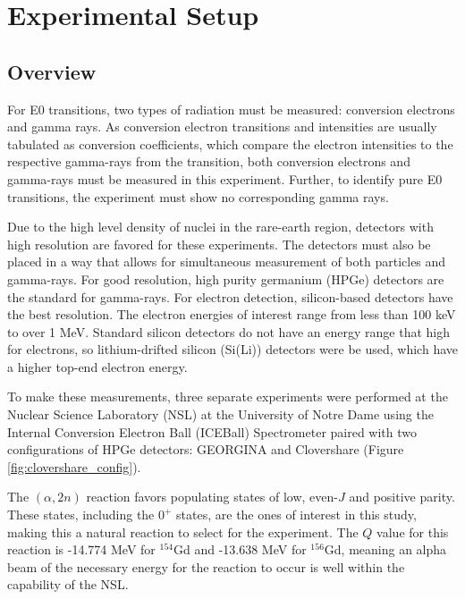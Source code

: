 %
%

\chapter{Experimental Setup}
\label{chap:setup}

\section{Overview}

For E0 transitions, two types of radiation must be measured: conversion electrons and gamma rays. As conversion electron transitions and intensities are usually tabulated as conversion coefficients, which compare the electron intensities to the respective gamma-rays from the transition, both conversion electrons and gamma-rays must be measured in this experiment. Further, to identify pure E0 transitions, the experiment must show no corresponding gamma rays.

Due to the high level density of nuclei in the rare-earth region, detectors with high resolution are favored for these experiments. The detectors must also be placed in a way that allows for simultaneous measurement of both particles and gamma-rays. For good resolution, high purity germanium (HPGe) detectors are the standard for gamma-rays. For electron detection, silicon-based detectors have the best resolution. The electron energies of interest range from less than 100 keV to over 1 MeV. Standard silicon detectors do not have an energy range that high for electrons, so lithium-drifted silicon (Si(Li)) detectors were be used, which have a higher top-end electron energy.

To make these measurements, three separate experiments were performed at the Nuclear Science Laboratory (NSL) at the University of Notre Dame using the Internal Conversion Electron Ball (ICEBall) Spectrometer paired with two configurations of HPGe detectors: GEORGINA and Clovershare (Figure \ref{fig:clovershare_config}). 

%



The $(\alpha,2n)$ reaction favors populating states of low, even-$J$ and positive parity. These states, including the $0^+$ states, are the ones of interest in this study, making this a natural reaction to select for the experiment. The $Q$ value for this reaction is -14.774 MeV for $^{154}$Gd and -13.638 MeV for $^{156}$Gd, meaning an alpha beam of the necessary energy for the reaction to occur is well within the capability of the NSL.

